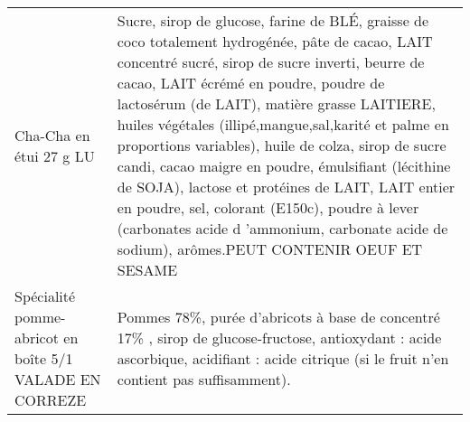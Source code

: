 \begin{longtable}{p{5cm}p{10cm}}
                                                                                  Cha-Cha en étui 27 g LU &                                                                                                                                                                                                                                                                                                                                                                                                                     Sucre, sirop de glucose, farine de BLÉ, graisse de coco totalement hydrogénée, pâte de cacao, LAIT concentré sucré, sirop de sucre inverti, beurre de cacao, LAIT écrémé en poudre, poudre de lactosérum (de LAIT), matière grasse LAITIERE, huiles végétales (illipé,mangue,sal,karité et palme en proportions variables), huile de colza, sirop de sucre candi, cacao maigre en poudre, émulsifiant (lécithine de SOJA), lactose et protéines de LAIT, LAIT entier en poudre, sel, colorant (E150c), poudre à lever (carbonates acide d 'ammonium, carbonate acide de sodium), arômes.PEUT CONTENIR OEUF ET SESAME \\
                                                  Spécialité pomme-abricot en boîte 5/1 VALADE EN CORREZE &                                                                                                                                                                                                                                                                                                                                                                                                                                                                                                                                                                                                                                                                                                                                                                                                                                              Pommes 78\%, purée d'abricots à base de concentré 17\% , sirop de glucose-fructose, antioxydant : acide ascorbique, acidifiant : acide citrique (si le fruit n'en contient pas suffisamment). \\

\end{longtable}
